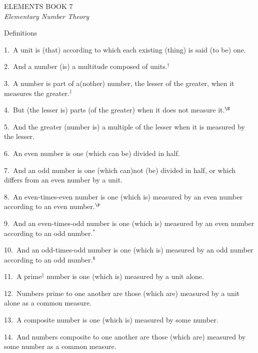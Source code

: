 \pagestyle{plain}
\begin{center}
{\Huge ELEMENTS BOOK 7}\\
\spa\spa\spa
{\huge\it Elementary Number Theory}
\end{center}\newpage

\pagestyle{fancy}
\cfoot{\gr{\thepage}}

\begin{center}
{\large Definitions}
\end{center}

1.~A unit is (that) according to which each  existing (thing)  is said (to be) one.

2.~And a number (is) a multitude composed of units.$^\dag$

3.~A number is part of a(nother) number, the lesser of the greater, when
it measures the greater.$^\ddag$

4.~But (the lesser is) parts (of the greater) when it does not measure it.$^\S$

5.~And the greater (number is) a multiple of the lesser when it is measured by
the lesser.

6.~An even number is one (which can be) divided in half.

7.~And an odd number is one (which can)not (be) divided in half, 
or which  differs from an even number by a unit.

8.~An even-times-even number is one (which is) measured by an
even number according to an even number.$^\P$

9.~And an even-times-odd number is one (which is) measured by an
even number according to an odd number.$^\ast$

10.~And an odd-times-odd number is one (which is) measured by an
odd number according to an odd number.$^\$$

11.~A prime$^\|$  number is one (which is) measured by a unit alone.

12.~Numbers prime to one another are those (which are) measured by a unit
alone as a common measure.

13.~A composite number is one (which is) measured by some number.

14.~And numbers composite to one another are those (which are) measured
by some number as a common measure.

